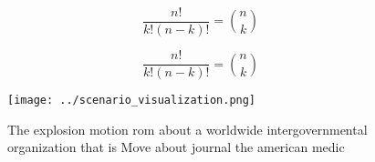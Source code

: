 \documentclass[a4paper]{article}
\begin{document}
\[ \frac{n!}{k!(n-k)!} = \binom{n}{k} \]

\[ \frac{n!}{k!(n-k)!} = \binom{n}{k} \]

\begin{figure}
\centering
\texttt{[image: ../scenario\_visualization.png]}
\caption{The explosion motion rom about a worldwide intergovernmental organization that is Move about journal the american medic
}
\end{figure}
 
\end{document}
